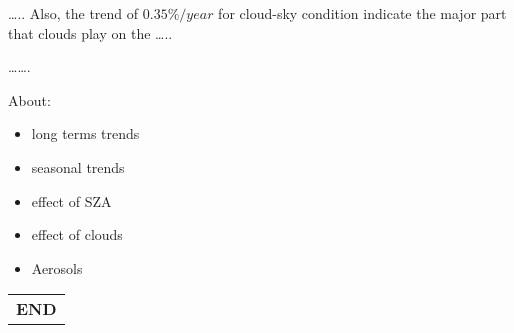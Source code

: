 \documentclass[preprint, 3p,
authoryear]{elsarticle} %
\begin{document}
\ldots.. Also, the trend of \(0.35\%/year\) for cloud-sky condition
indicate the major part that clouds play on the \ldots..

\ldots\ldots.

About:

\begin{itemize}
\item
  long terms trends
\item
  seasonal trends
\item
  effect of SZA
\item
  effect of clouds
\item
  Aerosols
\end{itemize}

\begin{longtable}[]{@{}c@{}}
\toprule\noalign{}
\endhead
\bottomrule\noalign{}
\endlastfoot
\textbf{END} \\
\end{longtable}


\end{document}
